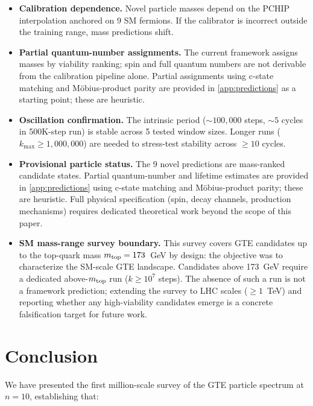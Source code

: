 \documentclass[12pt]{article}
\numberwithin{equation}{section}
\begin{document}
\begin{itemize}[nosep]
\item \textbf{Calibration dependence.} Novel particle masses depend on the PCHIP interpolation anchored on 9 SM fermions. If the calibrator is incorrect outside the training range, mass predictions shift.
\item \textbf{Partial quantum-number assignments.} The current framework assigns masses by viability ranking; spin and full quantum numbers are not derivable from the calibration pipeline alone. Partial assignments using c-state matching and Möbius-product parity are provided in \cref{app:predictions} as a starting point; these are heuristic.
\item \textbf{Oscillation confirmation.} The intrinsic period (${\sim}100{,}000$ steps, ${\sim}5$ cycles in 500K-step run) is stable across 5 tested window sizes. Longer runs ($k_{\max} \geq 1{,}000{,}000$) are needed to stress-test stability across ${\geq}10$ cycles.
\item \textbf{Provisional particle status.} The 9 novel predictions are mass-ranked candidate states. Partial quantum-number and lifetime estimates are provided in \cref{app:predictions} using c-state matching and Möbius-product parity; these are heuristic. Full physical specification (spin, decay channels, production mechanisms) requires dedicated theoretical work beyond the scope of this paper.
\item \textbf{SM mass-range survey boundary.} This survey covers GTE candidates up to the top-quark mass $m_{\rm top} = 173$~GeV by design: the objective was to characterize the SM-scale GTE landscape. Candidates above 173~GeV require a dedicated above-$m_{\rm top}$ run ($k \geq 10^7$ steps). The absence of such a run is not a framework prediction; extending the survey to LHC scales (${\geq}1$~TeV) and reporting whether any high-viability candidates emerge is a concrete falsification target for future work.
\end{itemize}

\section{Conclusion}
\label{sec:conclusion}

We have presented the first million-scale survey of the GTE particle spectrum at $n{=}10$, establishing that:
\end{document}
